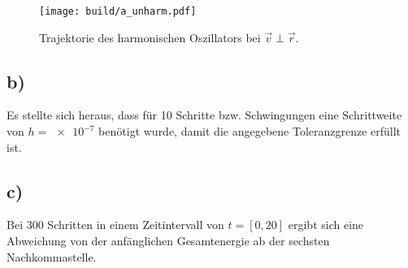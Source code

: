 \begin{figure}
  \centering
  \texttt{[image: build/a\_unharm.pdf]}
    \caption{Trajektorie des harmonischen Oszillators bei $\vec{v} \perp \vec{r}$.}
  \label{fig:unharm}
\end{figure}

\subsection*{b)}
Es stellte sich heraus, dass für 10 Schritte bzw. Schwingungen eine Schrittweite
von $h = \num{e-7}$ benötigt wurde, damit die angegebene Toleranzgrenze erfüllt
ist.

\subsection*{c)}
Bei 300 Schritten in einem Zeitintervall von $t = [0, 20]$ ergibt sich eine Abweichung
von der anfänglichen Gesamtenergie ab der sechsten Nachkommastelle.
